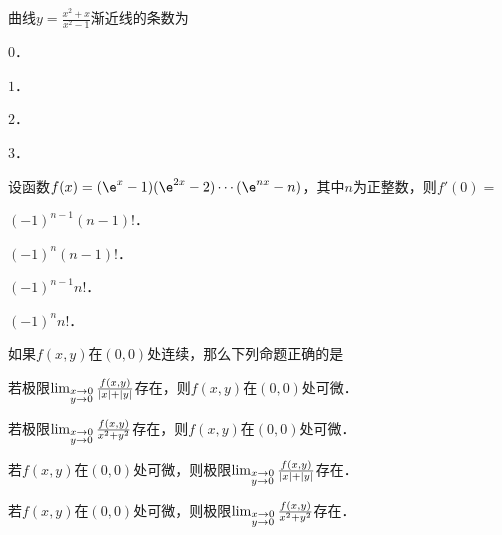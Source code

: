 \documentclass[plain,noanswer,medmath]{../../template/jnuexam}
\begin{document}




\begin{problem}
曲线$y = \frac{x^2 + x}{x^2 - 1}$渐近线的条数为\pickout{}
\begin{abcd}
\item $0$．
\item $1$．
\item $2$．
\item $3$．
\end{abcd}
\end{problem}


\begin{problem}
设函数$f(x) = (\e^x - 1)(\e^{2x} - 2) \cdots(\e^{nx} - n)$，其中$n$为正整数，则$f'(0) =$\pickout{}
\begin{abcd}
\item $(- 1)^{n - 1}(n - 1)!$．
\item $(- 1)^n(n - 1)!$．
\item $(- 1)^{n - 1} n!$．
\item $(- 1)^n n!$．
\end{abcd}
\end{problem}


\begin{problem}
如果$f(x,y)$在$\left(0,0 \right)$处连续，那么下列命题正确的是\pickout{}
\begin{abcd}
\item 若极限$\lim_{\begin{subarray}{l}
  x \to 0 \\
  y \to 0
\end{subarray}} \frac{f(x,y)}{|x| + |y|}$存在，则$f(x,y)$在$(0,0)$处可微．
\item 若极限$\lim_{\begin{subarray}{l}
  x \to 0 \\
  y \to 0
\end{subarray}} \frac{f(x,y)}{x^2 + y^2}$存在，则$f(x,y)$在$(0,0)$处可微．
\item 若$f(x,y)$在$(0,0)$处可微，则极限$\lim_{\begin{subarray}{l}
  x \to 0 \\
  y \to 0
\end{subarray}} \frac{f(x,y)}{|x| + |y|}$存在．
\item 若$f(x,y)$在$(0,0)$处可微，则极限$\lim_{\begin{subarray}{l}
  x \to 0 \\
  y \to 0
\end{subarray}} \frac{f(x,y)}{x^2 + y^2}$存在．
\end{abcd}
\end{problem}
\end{document}
